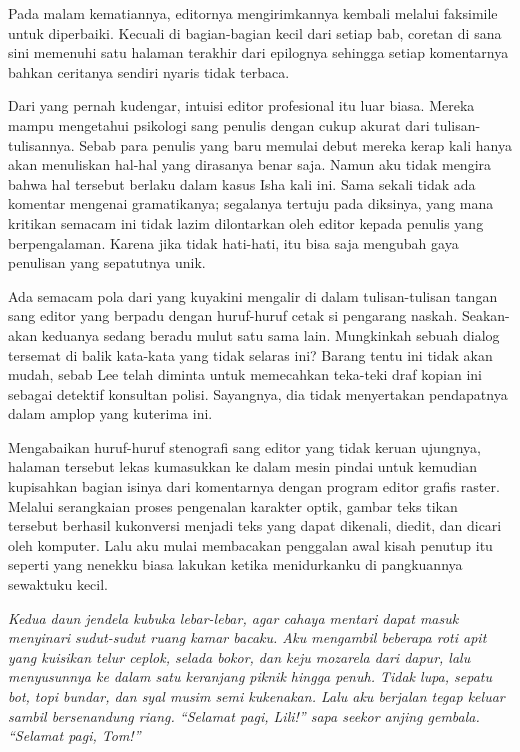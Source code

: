 \documentclass[smalldemyvopaper,11pt,twoside,onecolumn,openright,extrafontsizes]{memoir}
\begin{document}
Pada malam kematiannya, editornya mengirimkannya kembali melalui faksimile untuk diperbaiki. Kecuali di bagian-bagian kecil dari setiap bab, coretan di sana sini memenuhi satu halaman terakhir dari epilognya sehingga setiap komentarnya bahkan ceritanya sendiri nyaris tidak terbaca. %

Dari yang pernah kudengar, intuisi editor profesional itu luar biasa. Mereka mampu mengetahui psikologi sang penulis dengan cukup akurat dari tulisan-tulisannya. Sebab para penulis yang baru memulai debut mereka kerap kali hanya akan menuliskan hal-hal yang dirasanya benar saja. Namun aku tidak mengira bahwa hal tersebut berlaku dalam kasus Isha kali ini. Sama sekali tidak ada komentar mengenai gramatikanya; segalanya tertuju pada diksinya, yang mana kritikan semacam ini tidak lazim dilontarkan oleh editor kepada penulis yang berpengalaman. Karena jika tidak hati-hati, itu bisa saja mengubah gaya penulisan yang sepatutnya unik.


Ada semacam pola dari yang kuyakini mengalir di dalam tulisan-tulisan tangan sang editor yang berpadu dengan huruf-huruf cetak si pengarang naskah. Seakan-akan keduanya sedang beradu mulut satu sama lain. Mungkinkah sebuah dialog tersemat di balik kata-kata yang tidak selaras ini? Barang tentu ini tidak akan mudah, sebab Lee telah diminta untuk memecahkan teka-teki draf kopian ini sebagai detektif konsultan polisi. Sayangnya, dia tidak menyertakan pendapatnya dalam amplop yang kuterima ini.


Mengabaikan huruf-huruf stenografi sang editor yang tidak keruan ujungnya, halaman tersebut lekas kumasukkan ke dalam mesin pindai untuk kemudian kupisahkan bagian isinya dari komentarnya dengan program editor grafis raster. Melalui serangkaian proses pengenalan karakter optik, gambar teks tikan tersebut berhasil kukonversi menjadi teks yang dapat dikenali, diedit, dan dicari oleh komputer. Lalu aku mulai membacakan penggalan awal kisah penutup itu seperti yang nenekku biasa lakukan ketika menidurkanku di pangkuannya sewaktuku kecil.


\textit{Kedua daun jendela kubuka lebar-lebar, agar cahaya mentari dapat masuk menyinari sudut-sudut ruang kamar bacaku. Aku mengambil beberapa roti apit yang kuisikan telur ceplok, selada bokor, dan keju mozarela dari dapur, lalu menyusunnya ke dalam satu keranjang piknik hingga penuh. Tidak lupa, sepatu bot, topi bundar, dan syal musim semi kukenakan. Lalu aku berjalan tegap keluar sambil bersenandung riang. ``Selamat pagi, Lili!'' sapa seekor anjing gembala. ``Selamat pagi, Tom!''}
\end{document}
